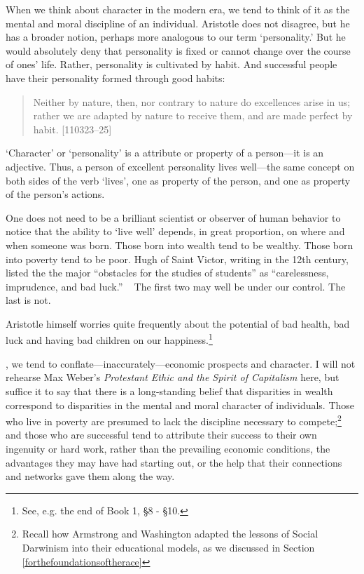 When we think about character in the modern era, we tend to think of it as the mental and moral discipline of an individual. Aristotle does not disagree, but he has a broader notion, perhaps more analogous to our term `personality.' But he would absolutely deny that personality is fixed or cannot change over the course of ones' life. Rather, personality is cultivated by habit. And successful people have their personality formed through good habits:

\begin{quote}

Neither by nature, then, nor contrary to nature do excellences arise in us; rather we are adapted by nature to receive them, and are made perfect by habit. [110323--25]
\end{quote}

`Character' or `personality' is a attribute or property of a person---it is an adjective. Thus, a person of excellent personality lives well---the same concept on both sides of the verb `lives', one as property of the person, and one as property of the person's actions.

One does not need to be a brilliant scientist or observer of human behavior to notice that the ability to `live well' depends, in great proportion, on where and when someone was born. Those born into wealth tend to be wealthy. Those born into poverty tend to be poor. Hugh of Saint Victor, writing in the 12th century, listed the the major ``obstacles for the studies of students'' as ``carelessness, imprudence, and bad luck.'' ~\citep[p. 127]{SaintVictor:1991vp} The first two may well be under our control. The last is not.

Aristotle himself worries quite frequently about the potential of bad health, bad luck and having bad children on our happiness.\footnote{See, e.g. the end of Book 1, \S8 - \S10.} 

, we tend to conflate---inaccurately---economic prospects and character. I will not rehearse Max Weber's \emph{Protestant Ethic and the Spirit of Capitalism} here, but suffice it to say that there is a long-standing belief that disparities in wealth correspond to disparities in the mental and moral character of individuals. Those who live in poverty are presumed to lack the discipline necessary to compete;\footnote{Recall how Armstrong and Washington adapted the lessons of Social Darwinism into their educational models, as we discussed in Section \ref{forthefoundationsoftherace}} and those who are successful tend to attribute their success to their own ingenuity or hard work, rather than the prevailing economic conditions, the advantages they may have had starting out, or the help that their connections and networks gave them along the way.

